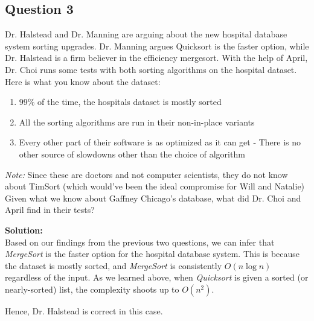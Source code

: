 \documentclass[12pt]{article}
\begin{document}
    \subsection{Question 3}
    Dr. Halstead and Dr. Manning are arguing about the new hospital database system sorting upgrades. Dr. Manning argues Quicksort is the faster option, while Dr. Halstead is a firm believer in the efficiency mergesort. With the help of April, Dr. Choi runs some tests with both sorting algorithms on the hospital dataset. Here is what you know about the dataset:
    \begin{enumerate}
        \item 99\% of the time, the hospitals dataset is mostly sorted
        \item All the sorting algorithms are run in their non-in-place variants
        \item Every other part of their software is as optimized as it can get - There is no other source of slowdowns other than the choice of algorithm
    \end{enumerate}
    \textit{Note: }Since these are doctors and not computer scientists, they do not know about TimSort (which would’ve been the ideal compromise for Will and Natalie)\\

  Given what we know about Gaffney Chicago's database, what did Dr. Choi and April find in their tests? 

  \textbf{Solution:} \\

  Based on our findings from the previous two questions, we can infer that \textit{MergeSort} is the faster option for the hospital database system. This is because the dataset is mostly sorted, and \textit{MergeSort} is consistently $O(n \log n)$ regardless of the input. As we learned above, when \textit{Quicksort} is given a sorted (or nearly-sorted) list, the complexity shoots up to $O(n^2)$. 

  Hence, Dr. Halstead is correct in this case.
\end{document}
